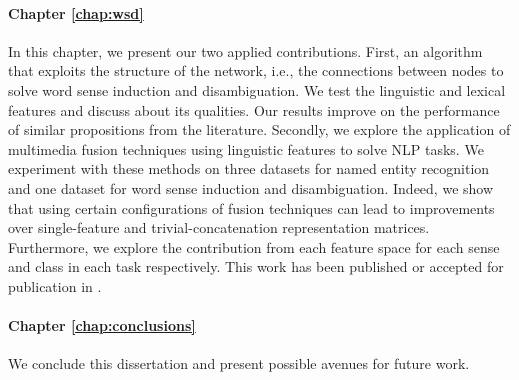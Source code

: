 \paragraph{Chapter \ref{chap:wsd}} In this chapter, we present our two applied contributions. First, an algorithm that exploits the structure of the network, i.e., the connections between nodes to solve word sense induction and disambiguation. 
We test the linguistic and lexical features and discuss about its qualities. Our results improve on the performance of similar propositions from the literature.
Secondly, we explore the application of multimedia fusion techniques using linguistic features to solve NLP tasks. 
We experiment with these methods on three datasets for named entity recognition and one dataset for word sense induction and disambiguation. Indeed, we show that using certain configurations of fusion techniques can lead to improvements over single-feature and trivial-concatenation representation matrices. Furthermore, we explore the contribution from each feature space for each sense and class in each task respectively. This work has been published or accepted for publication in \cite{sorianoCICLING,sorianoDS}.	

\paragraph{Chapter \ref{chap:conclusions}} We conclude this dissertation and present possible avenues for future work.

